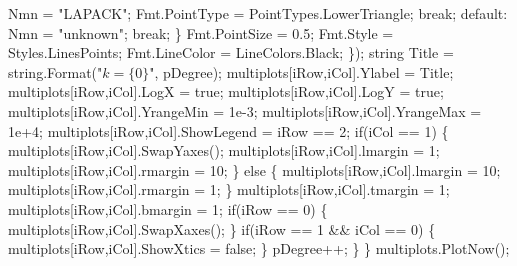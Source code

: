 {\btab \btab \btab    Nmn           = "LAPACK"; \newline 
\btab \btab \btab    Fmt.PointType = PointTypes.LowerTriangle;\newline 
\btab \btab \btab    break;\newline 
\btab \btab    default: \newline 
\btab \btab \btab    Nmn = "unknown"; \newline 
\btab \btab \btab    break;\newline 
\btab \btab    \} \newline 
\btab \btab    Fmt.PointSize = 0.5;\newline 
\btab \btab    Fmt.Style     = Styles.LinesPoints;\newline 
\btab \btab    Fmt.LineColor = LineColors.Black;\newline 
\btab    \});\newline 
 \newline 
\btab string Title = string.Format("$k = \{0\}$", pDegree);\newline 
\btab multiplots[iRow,iCol].Ylabel = Title;\newline 
\btab multiplots[iRow,iCol].LogX = true;\newline 
\btab multiplots[iRow,iCol].LogY = true;\newline 
 \newline 
\btab multiplots[iRow,iCol].YrangeMin = 1e-3;\newline 
\btab multiplots[iRow,iCol].YrangeMax = 1e+4;\newline 
 \newline 
\btab multiplots[iRow,iCol].ShowLegend = iRow == 2;\newline 
 \newline 
\btab if(iCol == 1) \{\newline 
\btab \btab multiplots[iRow,iCol].SwapYaxes();\newline 
\btab \btab multiplots[iRow,iCol].lmargin = 1;\newline 
\btab \btab multiplots[iRow,iCol].rmargin = 10;\newline 
\btab \} else \{\newline 
\btab \btab multiplots[iRow,iCol].lmargin = 10;\newline 
\btab \btab multiplots[iRow,iCol].rmargin = 1;\newline 
\btab \}\newline 
\btab multiplots[iRow,iCol].tmargin = 1;\newline 
\btab multiplots[iRow,iCol].bmargin = 1;\newline 
\btab if(iRow == 0) \{\newline 
\btab \btab multiplots[iRow,iCol].SwapXaxes();\newline 
\btab \}\newline 
\btab if(iRow == 1 && iCol == 0) \{  \newline 
\btab \btab multiplots[iRow,iCol].ShowXtics = false;\newline 
\btab \}\newline 
\btab pDegree++;\newline 
\}                        \newline 
\}\newline 
multiplots.PlotNow();
 }
\BoSSSexe
{}
\BoSSSexe
{}
\BoSSSexe
